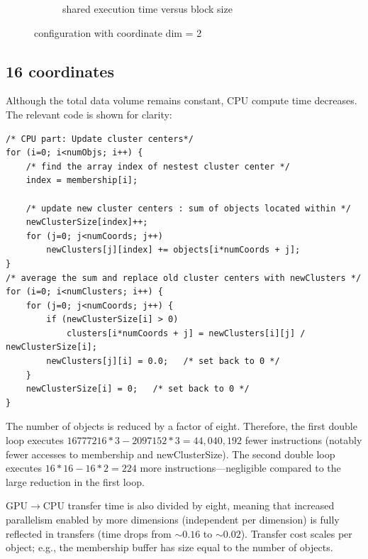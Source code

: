 \documentclass{article}
\newcommand{\eng}[1]{#1}
\begin{document}
\begin{figure}[h]
\begin{subfigure}{0.65\textwidth}
        \caption{\eng{shared} execution time versus \eng{block size}}
        \label{fig:shared_pbs2}
    \end{subfigure}
    \caption{\eng{configuration with coordinate dim = 2}}
\end{figure}
\FloatBarrier

\clearpage
\subsection{\eng{16 coordinates}}

Although the total data volume remains constant, CPU compute time decreases. The relevant code is shown for clarity:

\begin{lstlisting}[style=CStyle]
/* CPU part: Update cluster centers*/  		
for (i=0; i<numObjs; i++) {
    /* find the array index of nestest cluster center */
    index = membership[i];
    
    /* update new cluster centers : sum of objects located within */
    newClusterSize[index]++;
    for (j=0; j<numCoords; j++)
        newClusters[j][index] += objects[i*numCoords + j];
}
/* average the sum and replace old cluster centers with newClusters */
for (i=0; i<numClusters; i++) {
    for (j=0; j<numCoords; j++) {
        if (newClusterSize[i] > 0)
            clusters[i*numCoords + j] = newClusters[i][j] / newClusterSize[i];
        newClusters[j][i] = 0.0;   /* set back to 0 */
    }
    newClusterSize[i] = 0;   /* set back to 0 */
}
\end{lstlisting}

The number of objects is reduced by a factor of eight. Therefore, the first double loop executes $16777216 * 3 - 2097152 * 3 = 44{,}040{,}192$ fewer instructions (notably fewer accesses to \eng{membership} and \eng{newClusterSize}). The second double loop executes $16 * 16 - 16 * 2 = 224$ more instructions—negligible compared to the large reduction in the first loop.

GPU$\rightarrow$CPU transfer time is also divided by eight, meaning that increased parallelism enabled by more dimensions (independent per dimension) is fully reflected in transfers (time drops from $\sim0.16$ to $\sim0.02$). Transfer cost scales per object; e.g., the \eng{membership} buffer has size equal to the number of objects.
\end{document}
